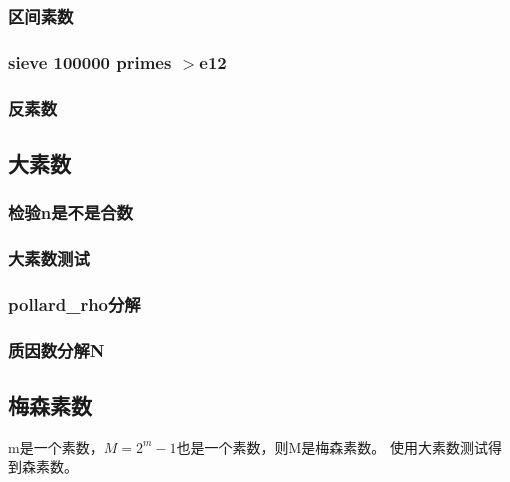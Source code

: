 \documentclass[a4paper]{article}
\begin{document}
\begin{CJK*}{UTF8}{gbsn}
\begin{multicols}{3}
\begin{flushleft}
\subsubsection{区间素数}


\subsubsection{sieve 100000 primes \texorpdfstring{$>$} 1e12}


\subsubsection{反素数}




\subsection{大素数}




\subsubsection{检验n是不是合数}




\subsubsection{大素数测试}


\subsubsection{pollard\_rho分解}



\subsubsection{质因数分解N }


\subsection{梅森素数}
m是一个素数，$M=2^m-1$也是一个素数，则M是梅森素数。
使用大素数测试得到森素数。


\end{flushleft}
\end{multicols}
\end{CJK*}
\end{document}
